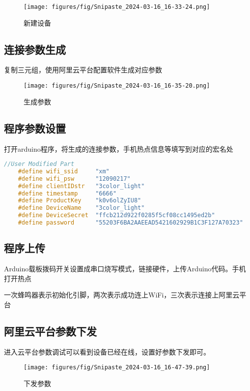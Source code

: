 \documentclass[12pt,hyperref,a4paper,UTF8]{ctexart}
\begin{document}
    \begin{figure}[H]
        \centering
        \texttt{[image: figures/fig/Snipaste\_2024-03-16\_16-33-24.png]}
        \caption{新建设备}
        \label{fig:enter-label}
    \end{figure}

\subsection*{连接参数生成}

    复制三元组，使用阿里云平台配置软件生成对应参数
    \begin{figure}[H]
        \centering
        \texttt{[image: figures/fig/Snipaste\_2024-03-16\_16-35-20.png]}
        \caption{生成参数}
        \label{fig:enter-label}
    \end{figure}

\subsection*{程序参数设置}
    打开arduino程序，将生成的连接参数，手机热点信息等填写到对应的宏名处
\begin{lstlisting}[language=C++]
    //User Modified Part
    #define wifi_ssid     "xm"    
    #define wifi_psw      "12090217"     
    #define clientIDstr   "3color_light"
    #define timestamp     "6666"
    #define ProductKey    "k0v6olZyIU8"
    #define DeviceName    "3color_light"
    #define DeviceSecret  "ffcb212d922f0285f5cf08cc1495ed2b"
    #define password      "55203F6BA2AAEEAD5421602929B1C3F127A70323"
\end{lstlisting}

\subsection*{程序上传}
Arduino载板拨码开关设置成串口烧写模式，链接硬件，上传Arduino代码。手机打开热点


一次蜂鸣器表示初始化引脚，两次表示成功连上WiFi，三次表示连接上阿里云平台

\subsection*{阿里云平台参数下发}
进入云平台参数调试可以看到设备已经在线，设置好参数下发即可。

    \begin{figure}[H]
        \centering
        \texttt{[image: figures/fig/Snipaste\_2024-03-16\_16-47-39.png]}
        \caption{下发参数}
        \label{fig:6}
    \end{figure}  
\end{document}

